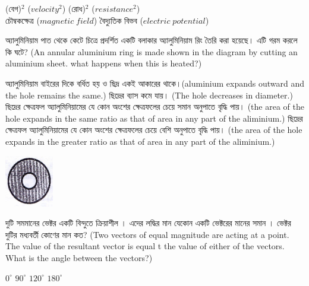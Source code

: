 \documentclass[addpoints]{exam}
\begin{document}
\begin{questions}
\begin{oneparchoices}
\choice (বেগ)$ ^{2} $ ($ velocity^{2} $)
\hspace*{1.4cm}\choice  (রোধ)$ ^{2} $ ($ resistance^{2} $)\\
\hspace*{-.32cm}\choice  চৌম্বকক্ষেত্র ($ magnetic\; field $)
\choice  বৈদ্যুতিক বিভব ($ electric\; potential $)
\end{oneparchoices}

\question   অ্যালুমিনিয়াম পাত থেকে কেটে চিত্রে প্রদর্শিত একটি বলাকার অ্যালুমিনিয়াম রিং তৈরি করা হয়েছে। এটি গরম করলে কি ঘটে? (An annular aluminium ring is made shown in the diagram by cutting an aluminium sheet. what happens when this is heated?)

\begin{minipage}{0.6\textwidth}\raggedright
\begin{oneparchoices}
\choice অ্যালুমিনিয়াম বাইরের দিকে বর্ধিত হয় ও ছিদ্র একই আকারের থাকে।(aluminium expands outward and the hole remains the same.)
\choice  ছিদ্রের ব্যাস কমে যায়। (The hole decreases in diameter.)
\choice  ছিদ্রের ক্ষেত্রফল অ্যালুমিনিয়ামের যে কোন অংশের ক্ষেত্রফলের চেয়ে সমান অনুপাতে বৃদ্ধি পায়। (the area of the hole expands in the same ratio as that of area in any part of the aliminium.)
\choice ছিদ্রের ক্ষেত্রফল অ্যালুমিনিয়ামের যে কোন অংশের ক্ষেত্রফলের চেয়ে বেশি অনুপাতে বৃদ্ধি পায়। (the area of the hole expands in the greater ratio as that of area in any part of the aliminium.)
\end{oneparchoices}
\end{minipage}
\hfill%
\begin{minipage}{0.3\textwidth}%
\includegraphics{du-al.png}
\end{minipage}%



\question   দুটি সমমানের ভেক্টর একটি বিন্দুতে ক্রিয়াশীল । এদের লদ্ধির মান যেকোন একটি ভেক্টরের মানের সমান । ভেক্টর দুটির মধ্যবর্তী কোণের মান কত? (Two vectors of equal magnitude are acting at a point. The value of the resultant vector is equal t the value of either of the vectors. What is the angle between the vectors?)

\begin{oneparchoices}
\choice $ 0^{\circ} $
\choice $ 90^{\circ} $
\choice $ 120^{\circ} $
\choice $ 180^{\circ} $
\end{oneparchoices}


\end{questions}
\end{document}

